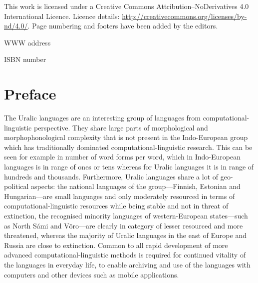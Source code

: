 \documentclass[b5paper]{book}
\begin{document}
\frontmatter

\cleardoublepage
\thispagestyle{empty}
{\centering{}}

This work is licensed under a Creative Commons Attribution–NoDerivatives
4.0 International Licence.  Licence details:
\url{http://creativecommons.org/licenses/by-nd/4.0/}. Page numbering and
footers have been added by the editors.

WWW address

ISBN number

\clearpage

\pagestyle{fancy}

\chapter*{Preface}

The Uralic languages are an interesting group of languages from computational-linguistic perspective. They share 
large parts of morphological and morphophonological
complexity that is not present in the Indo-European group which has
traditionally dominated computational-linguistic research. This can be
seen for example in number of word forms per word, which in Indo-European
languages is in range of ones or tens whereas for Uralic languages it is
in range of hundreds and thousands. Furthermore, Uralic languages share a lot
of geo-political aspects: the national languages of the group---Finnish,
Estonian and Hungarian---are small languages and only moderately resourced
in terms of computational-linguistic resources while being stable and
not in threat of extinction, the recognised minority languages of western-European 
states---such as North Sámi and Võro---are clearly in category
of lesser resourced and more threatened, whereas the majority of Uralic
languages in the east of Europe and Russia are close to extinction. Common
to all rapid development of more advanced computational-linguistic methods
is required for continued vitality of the languages in everyday life, to
enable archiving and use of the languages with computers and other devices
such as mobile applications.
\end{document}
